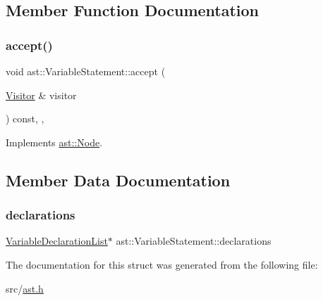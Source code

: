 \subsection{Member Function Documentation}
\mbox{\label{structast_1_1_variable_statement_a79a66f04eccbb99d1c7dddc5f0d59fcb}} 
\subsubsection{\texorpdfstring{accept()}{accept()}}
{\footnotesize\ttfamily void ast\+::\+Variable\+Statement\+::accept (\begin{DoxyParamCaption}\item[{\hyperlink{structast_1_1_visitor}{Visitor} \&}]{visitor }\end{DoxyParamCaption}) const\hspace{0.3cm}{\ttfamily [inline]}, {\ttfamily [override]}, {\ttfamily [virtual]}}



Implements \hyperlink{structast_1_1_node_abc089ee6caaf06a4445ebdd8391fdebc}{ast\+::\+Node}.



\subsection{Member Data Documentation}
\mbox{\label{structast_1_1_variable_statement_aa418c942437dae47f6368630199066eb}} 
\subsubsection{\texorpdfstring{declarations}{declarations}}
{\footnotesize\ttfamily \hyperlink{structast_1_1_variable_declaration_list}{Variable\+Declaration\+List}$\ast$ ast\+::\+Variable\+Statement\+::declarations}



The documentation for this struct was generated from the following file\+:\begin{DoxyCompactItemize}
\item 
src/\hyperlink{ast_8h}{ast.\+h}\end{DoxyCompactItemize}
